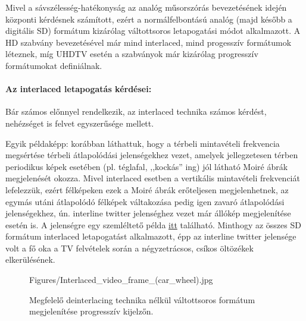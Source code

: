 Mivel a sávszélesség-hatékonyság az analóg műsorszórás bevezetésének idején központi kérdésnek számított, ezért a normálfelbontású analóg (majd később a digitális SD) formátum kizárólag váltottsoros letapogatási módot alkalmazott.
A HD szabvány bevezetésével már mind interlaced, mind progesszív formátumok léteznek, míg UHDTV esetén a szabványok már kizárólag progresszív formátumokat definiálnak.

\vspace{3mm}
\paragraph{Az interlaced letapogatás kérdései:}
Bár számos előnnyel rendelkezik, az interlaced technika számos kérdést, nehézséget is felvet egyszerűsége mellett.

Egyik példaképp: korábban láthattuk, hogy a térbeli mintavételi frekvencia megsértése térbeli átlapolódási jelenségekhez vezet, amelyek jellegzetesen térben periodikus képek esetében (pl. téglafal, ,,kockás'' ing) jól látható Moiré ábrák megjelenését okozza.
Mivel interlaced esetben a vertikális mintavételi frekvenciát lefelezzük, ezért félképeken ezek a Moiré ábrák erőteljesen megjelenhetnek, az egymás utáni átlapolódó félképek váltakozása pedig igen zavaró átlapolódási jelenségekhez, ún. interline twitter jelenséghez vezet már állókép megjelenítése esetén is.
A jelenségre egy szemléltető példa \href{https://en.wikipedia.org/wiki/File:Indian_Head_interlace.gif}{itt} található.
Minthogy az összes SD formátum interlaced letapogatást alkalmazott, épp az interline twitter jelensége volt a fő oka a TV felvételek során a négyzetrácsos, csíkos öltözékek elkerülésének.

\begin{figure}  
\small
  \begin{minipage}[c]{0.64\textwidth}
	\begin{overpic}[width = 1\columnwidth ]{Figures/Interlaced_video_frame_(car_wheel).jpg}
	\end{overpic}   \end{minipage}\hfill
	\begin{minipage}[c]{0.3\textwidth}
    \caption{Megfelelő deinterlacing technika nélkül váltottsoros formátum megjelenítése progresszív kijelzőn.}
\label{fig:deinterlacing}  \end{minipage}
\end{figure}

